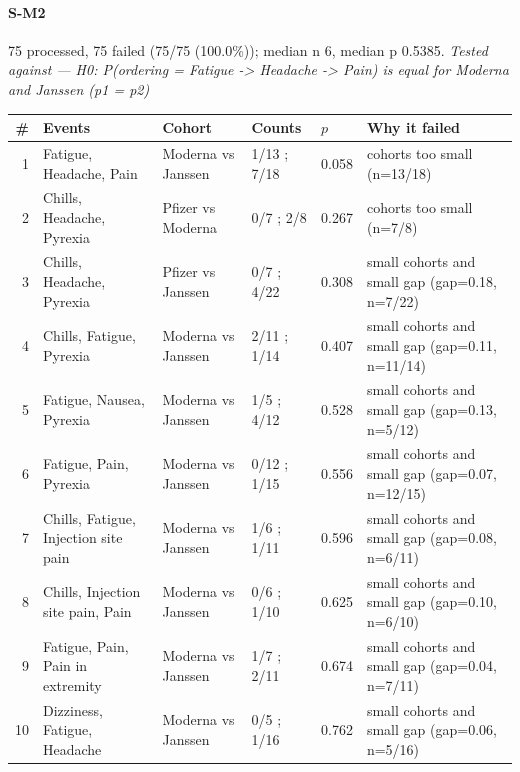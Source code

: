 \documentclass[11pt]{article}
\begin{document}
\paragraph{S-M2} 75 processed, 75 failed (75/75 (100.0\%)); median n 6, median p 0.5385. \emph{Tested against --- H0: P(ordering = Fatigue -> Headache -> Pain) is equal for Moderna and Janssen (p1 = p2)} \\
\begin{longtable}{@{}r p{3.9cm} p{2.5cm} l l p{4.4cm}@{}}
\toprule
\# & Events & Cohort & Counts & $p$ & Why it failed \\
\midrule \endhead
1 & Fatigue, Headache, Pain & Moderna vs Janssen & 1/13 ; 7/18 & 0.058 & cohorts too small (n=13/18) \\
2 & Chills, Headache, Pyrexia & Pfizer vs Moderna & 0/7 ; 2/8 & 0.267 & cohorts too small (n=7/8) \\
3 & Chills, Headache, Pyrexia & Pfizer vs Janssen & 0/7 ; 4/22 & 0.308 & small cohorts and small gap (gap=0.18, n=7/22) \\
4 & Chills, Fatigue, Pyrexia & Moderna vs Janssen & 2/11 ; 1/14 & 0.407 & small cohorts and small gap (gap=0.11, n=11/14) \\
5 & Fatigue, Nausea, Pyrexia & Moderna vs Janssen & 1/5 ; 4/12 & 0.528 & small cohorts and small gap (gap=0.13, n=5/12) \\
6 & Fatigue, Pain, Pyrexia & Moderna vs Janssen & 0/12 ; 1/15 & 0.556 & small cohorts and small gap (gap=0.07, n=12/15) \\
7 & Chills, Fatigue, Injection site pain & Moderna vs Janssen & 1/6 ; 1/11 & 0.596 & small cohorts and small gap (gap=0.08, n=6/11) \\
8 & Chills, Injection site pain, Pain & Moderna vs Janssen & 0/6 ; 1/10 & 0.625 & small cohorts and small gap (gap=0.10, n=6/10) \\
9 & Fatigue, Pain, Pain in extremity & Moderna vs Janssen & 1/7 ; 2/11 & 0.674 & small cohorts and small gap (gap=0.04, n=7/11) \\
10 & Dizziness, Fatigue, Headache & Moderna vs Janssen & 0/5 ; 1/16 & 0.762 & small cohorts and small gap (gap=0.06, n=5/16) \\
\bottomrule
\end{longtable}
\end{document}

